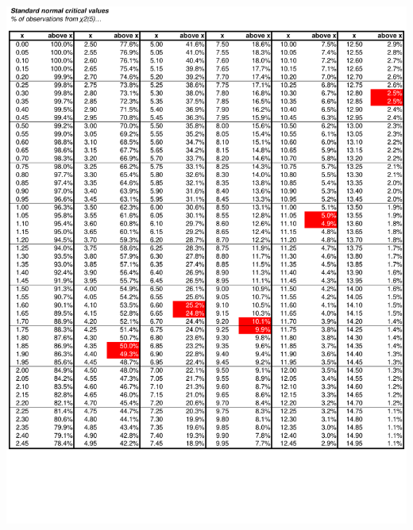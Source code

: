 \documentclass[8pt,letterpaper, landscape]{extarticle} %
\begin{document}
\begin{center}
\includegraphics[height=9.75in, angle=90]{images/cv7}
\end{center}
\end{document}
